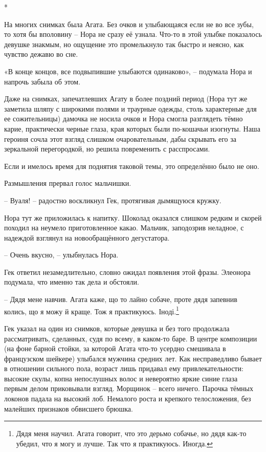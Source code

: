 \documentclass[
  a5paperpaper,
  DIV=11,
  numbers=noendperiod]{scrreprt}
\begin{document}
*

На многих снимках была Агата. Без очков и улыбающаяся если не во все
зубы, то хотя бы вполовину -- Нора не сразу её узнала. Что-то в этой
улыбке показалось девушке знакмым, но ощущение это промелькнуло так
быстро и неясно, как чувство дежавю во сне.

«В конце концов, все подвыпившие улыбаются одинаково», -- подумала Нора
и напрочь забыла об этом.

Даже на снимках, запечатлевших Агату в более поздний период (Нора тут же
заметила шляпу с широкими полями и траурные одежды, столь характерные
для ее сожительницы) дамочка не носила очков и Нора смогла разглядеть
тёмно карие, практически черные глаза, края которых были по-кошачьи
изогнуты. Наша героиня сочла этот взгляд слишком очаровательным, дабы
скрывать его за зеркальной перегородкой, но решила повременить с
расспросами.

Если и имелось время для поднятия таковой темы, это определённо было не
оно.

Размышления прервал голос мальчишки.

-- Вуаля! -- радостно воскликнул Гек, протягивая дымящуюся кружку.

Нора тут же приложилась к напитку. Шоколад оказался слишком редким и
скорей походил на неумело приготовленное какао. Мальчик, заподозрив
неладное, с надеждой взглянул на новообращённого дегустатора.

-- Очень вкусно, -- улыбнулась Нора.

Гек ответил незамедлительно, словно ожидал появления этой фразы.
Элеонора подумала, что именно так дела и обстояли.

-- Дядя мене навчив. Агата каже, що то лайно собаче, проте дядя запевнив
колись, що я можу й краще. Тож я практикуюсь. Іноді.\footnote{Дядя меня
  научил. Агата говорит, что это дерьмо собачье, но дядя как-то убедил,
  что я могу и лучше. Так что я практикуюсь. Иногда.}

Гек указал на один из снимков, которые девушка и без того продолжала
рассматривать, сделанных, судя по всему, в каком-то баре. В центре
композиции (на фоне барной стойки, за которой Агата что-то усердно
смешивала в французском шейкере) улыбался мужчина средних лет. Как
несправедливо бывает в отношении сильного пола, возраст лишь придавал
ему привлекательности: высокие скулы, копна непослушных волос и
невероятно яркие синие глаза первым делом приковывали взгляд. Морщинок
-- всего ничего. Парочка тёмных локонов падала на высокий лоб. Немалого
роста и крепкого телосложения, без малейших признаков обвисшего брюшка.
\end{document}
